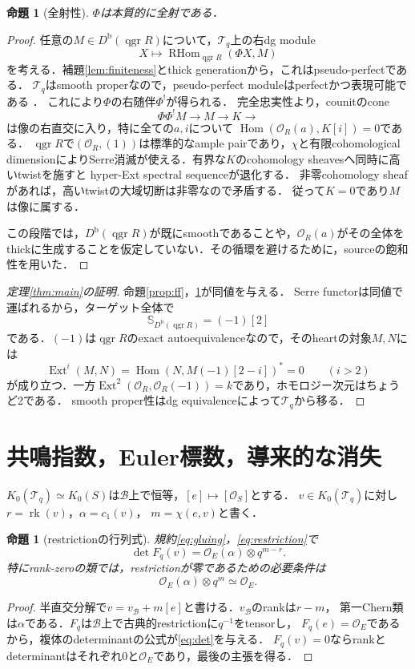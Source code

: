\documentclass[11pt,a4paper]{ltjsarticle}
\newtheorem{proposition}[theorem]{命題}
\theoremstyle{definition}
\newcommand{\OO}{\mathcal O}
\newcommand{\BB}{\mathcal B}
\newcommand{\TT}{\mathcal T}
\newcommand{\SSer}{\mathbb S}
\newcommand{\Db}{D^{\mathrm b}}
\newcommand{\RHom}{\operatorname{RHom}}
\newcommand{\Hom}{\operatorname{Hom}}
\newcommand{\Ext}{\operatorname{Ext}}
\newcommand{\qgr}{\operatorname{qgr}}
\newcommand{\rk}{\operatorname{rk}}
\begin{document}
\begin{proposition}[全射性]\label{prop:ess}
$\Phi$は本質的に全射である．
\end{proposition}
\begin{proof}
任意の$M\in\Db(\qgr R)$について，$\TT_q$上の右dg module
\[
 X\longmapsto\RHom_{\qgr R}(\Phi X,M)
\]
を考える．補題\ref{lem:finiteness}とthick generationから，これはpseudo-perfectである．
$\TT_q$はsmooth properなので，pseudo-perfect moduleはperfectかつ表現可能である
\cite[Theorem~3.18, Corollary~3.19]{Orlov}．
これにより$\Phi$の右随伴$\Phi^!$が得られる．
完全忠実性より，counitのcone
\[
 \Phi\Phi^!M\longrightarrow M\longrightarrow K\longrightarrow
\]
は像の右直交に入り，特に全ての$a,i$について
$\Hom(\OO_R(a),K[i])=0$である．
$\qgr R$で$(\OO_R,(1))$は標準的なample pairであり，$\chi$と有限cohomological
dimensionによりSerre消滅が使える．有界な$K$のcohomology sheavesへ同時に高いtwistを施すと
hyper-Ext spectral sequenceが退化する．
非零cohomology sheafがあれば，高いtwistの大域切断は非零なので矛盾する．
従って$K=0$であり$M$は像に属する．

この段階では，$\Db(\qgr R)$が既にsmoothであることや，$\OO_R(a)$がその全体を
thickに生成することを仮定していない．その循環を避けるために，sourceの飽和性を用いた．
\end{proof}

\begin{proof}[定理\ref{thm:main}の証明]
命題\ref{prop:ff}，\ref{prop:ess}が同値を与える．
Serre functorは同値で運ばれるから，ターゲット全体で
\[
 \SSer_{\Db(\qgr R)}=(-1)[2]
\]
である．$(-1)$は$\qgr R$のexact autoequivalenceなので，そのheartの対象$M,N$には
\[
 \Ext^i(M,N)=\Hom(N,M(-1)[2-i])^*=0\qquad(i>2)
\]
が成り立つ．一方$\Ext^2(\OO_R,\OO_R(-1))=k$であり，ホモロジー次元はちょうど2である．
smooth proper性はdg equivalenceによって$\TT_q$から移る．
\end{proof}

\section{共鳴指数，Euler標数，導来的な消失}\label{sec:period}
$K_0(\TT_q)\simeq K_0(S)$は$\BB$上で恒等，$[e]\mapsto[\OO_S]$とする．
$v\in K_0(\TT_q)$に対し$r=\rk(v)$，$\alpha=c_1(v)$，
$m=\chi(e,v)$と書く．
\begin{proposition}[restrictionの行列式]\label{prop:det}
規約\eqref{eq:gluing}，\eqref{eq:restriction}で
\begin{equation}\label{eq:det}
 \det F_q(v)=\OO_E(\alpha)\otimes q^{m-r}.
\end{equation}
特にrank-zeroの類では，restrictionが零であるための必要条件は
\begin{equation}\label{eq:resonance}
 \OO_E(\alpha)\otimes q^m\simeq\OO_E.
\end{equation}
\end{proposition}
\begin{proof}
半直交分解で$v=v_{\BB}+m[e]$と書ける．$v_{\BB}$のrankは$r-m$，
第一Chern類は$\alpha$である．$F_q$は$\BB$上で古典的restrictionに$q^{-1}$をtensorし，
$F_q(e)=\OO_E$であるから，複体のdeterminantの公式が\eqref{eq:det}を与える．
$F_q(v)=0$ならrankとdeterminantはそれぞれ0と$\OO_E$であり，最後の主張を得る．
\end{proof}
\end{document}

